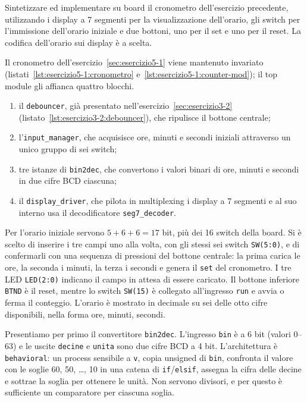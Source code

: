 \label{sec:esercizio5-2}

\begin{traccia}
Sintetizzare ed implementare su board il cronometro dell'esercizio precedente, utilizzando i display a 7 segmenti per la visualizzazione dell'orario, gli switch per l'immissione dell'orario iniziale e due bottoni, uno per il set e uno per il reset. La codifica dell'orario sui display è a scelta.
\end{traccia}

\progetto

Il cronometro dell'esercizio~\ref{sec:esercizio5-1} viene mantenuto invariato (listati~\ref{lst:esercizio5-1:cronometro} e~\ref{lst:esercizio5-1:counter-mod}); il top module gli affianca quattro blocchi.

\begin{enumerate}
  \item il \texttt{debouncer}, già presentato nell'esercizio~\ref{sec:esercizio3-2} (listato~\ref{lst:esercizio3-2:debouncer}), che ripulisce il bottone centrale;
  \item l'\texttt{input\_manager}, che acquisisce ore, minuti e secondi iniziali attraverso un unico gruppo di sei switch;
  \item tre istanze di \texttt{bin2dec}, che convertono i valori binari di ore, minuti e secondi in due cifre BCD ciascuna;
  \item il \texttt{display\_driver}, che pilota in multiplexing i display a 7 segmenti e al suo interno usa il decodificatore \texttt{seg7\_decoder}.
\end{enumerate}

Per l'orario iniziale servono $5+6+6=17$ bit, più dei 16 switch della board. Si è scelto di inserire i tre campi uno alla volta, con gli stessi sei switch \texttt{SW(5:0)}, e di confermarli con una sequenza di pressioni del bottone centrale: la prima carica le ore, la seconda i minuti, la terza i secondi e genera il \texttt{set} del cronometro. I tre LED \texttt{LED(2:0)} indicano il campo in attesa di essere caricato. Il bottone inferiore \texttt{BTND} è il reset, mentre lo switch \texttt{SW(15)} è collegato all'ingresso \texttt{run} e avvia o ferma il conteggio. L'orario è mostrato in decimale su sei delle otto cifre disponibili, nella forma ore, minuti, secondi.

\implementazione

Presentiamo per primo il convertitore \texttt{bin2dec}. L'ingresso \texttt{bin} è a 6 bit (valori 0--63) e le uscite \texttt{decine} e \texttt{unita} sono due cifre BCD a 4 bit. L'architettura è \texttt{behavioral}: un process sensibile a \texttt{v}, copia unsigned di \texttt{bin}, confronta il valore con le soglie 60, 50, \ldots, 10 in una catena di \texttt{if}/\texttt{elsif}, assegna la cifra delle decine e sottrae la soglia per ottenere le unità. Non servono divisori, e per questo è sufficiente un comparatore per ciascuna soglia.

